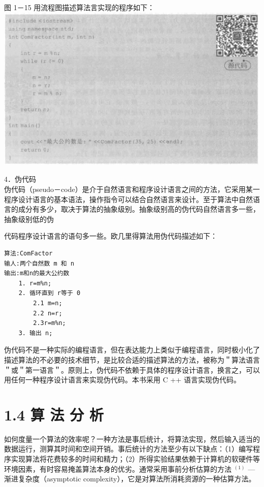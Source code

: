 \documentclass[10pt]{article}
\begin{document}
图 1－15 用流程图描述算法言实现的程序如下：\\
\includegraphics[max width=\textwidth, center]{2025_06_06_704745ea57b15b2333e5g-028(1)}

4．伪代码\\
伪代码（pseudo－code）是介于自然语言和程序设计语言之间的方法，它采用某一程序设计语言的基本语法，操作指令可以结合自然语言来设计。至于算法中自然语言的成分有多少，取决于算法的抽象级别。抽象级别高的伪代码自然语言多一些，抽象级别低的伪

代码程序设计语言的语句多一些。欧几里得算法用伪代码描述如下：

\begin{verbatim}
算法:ComFactor
输人:两个自然数 m 和 n
输出:m和n的最大公约数
    1. r=m%n;
    2. 循环直到 r等于 0
        2.1 m=n;
        2.2 n=r;
        2.3r=m%n;
    3. 输出 n;
\end{verbatim}

伪代码不是一种实际的编程语言，但在表达能力上类似于编程语言，同时极小化了描述算法的不必要的技术细节，是比较合适的描述算法的方法，被称为＂算法语言＂或＂第一语言＂。原则上，伪代码不依赖于具体的程序设计语言，换言之，可以用任何一种程序设计语言来实现伪代码。本书采用 C ++ 语言实现伪代码。

\section*{1.4 算 法 分 析}
如何度量一个算法的效率呢？一种方法是事后统计，将算法实现，然后输入适当的数据运行，测算其时间和空间开销。事后统计的方法至少有以下缺点：（1）编写程序实现算法将花费较多的时间和精力；（2）所得实验结果依赖于计算机的软硬件等环境因素，有时容易掩盖算法本身的优劣。通常采用事前分析估算的方法 ${ }^{(1)}$ —渐进复杂度（asymptotic complexity），它是对算法所消耗资源的一种估算方法。
\end{document}

